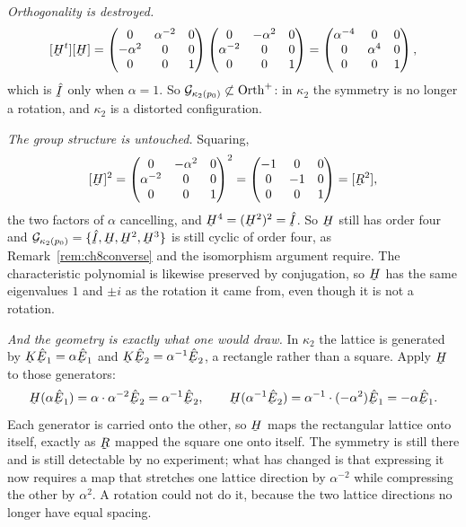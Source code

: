 \emph{Orthogonality is destroyed.}
\[
   [\bH^{t}][\bH]
   =\begin{pmatrix}0&\alpha^{-2}&0\\ -\alpha^{2}&0&0\\
                   0&0&1\end{pmatrix}
    \begin{pmatrix}0&-\alpha^{2}&0\\ \alpha^{-2}&0&0\\
                   0&0&1\end{pmatrix}
   =\begin{pmatrix}\alpha^{-4}&0&0\\ 0&\alpha^{4}&0\\
                   0&0&1\end{pmatrix},
\]
which is $\hI$ only when $\alpha=1$. So
$\mathcal{G}_{\kappa_{2}(p_{0})}\not\subset\operatorname{Orth}^{+}$: in $\kappa_{2}$
the symmetry is no longer a rotation, and $\kappa_{2}$ is a distorted
configuration.

\emph{The group structure is untouched.} Squaring,
\[
   [\bH]^{2}
   =\begin{pmatrix}0&-\alpha^{2}&0\\ \alpha^{-2}&0&0\\
                   0&0&1\end{pmatrix}^{2}
   =\begin{pmatrix}-1&0&0\\ 0&-1&0\\ 0&0&1\end{pmatrix}
   =[\bR^{2}],
\]
the two factors of $\alpha$ cancelling, and $\bH^{4}=(\bH^{2})^{2}=\hI$.
So $\bH$ still has order four and
$\mathcal{G}_{\kappa_{2}(p_{0})}=\{\hI,\bH,\bH^{2},\bH^{3}\}$ is still
cyclic of order four, as Remark~\ref{rem:ch8converse} and the
isomorphism argument require. The characteristic polynomial is likewise
preserved by conjugation, so $\bH$ has the same eigenvalues $1$ and
$\pm i$ as the rotation it came from, even though it is not a rotation.

\emph{And the geometry is exactly what one would draw.} In $\kappa_{2}$
the lattice is generated by $\bK\hbE_{1}=\alpha\hbE_{1}$ and
$\bK\hbE_{2}=\alpha^{-1}\hbE_{2}$, a rectangle rather than a square.
Apply $\bH$ to those generators:
\[
   \bH(\alpha\hbE_{1})=\alpha\cdot\alpha^{-2}\hbE_{2}
   =\alpha^{-1}\hbE_{2},
   \qquad
   \bH(\alpha^{-1}\hbE_{2})=\alpha^{-1}\cdot(-\alpha^{2})\hbE_{1}
   =-\alpha\hbE_{1}.
\]
Each generator is carried onto the other, so $\bH$ maps the rectangular
lattice onto itself, exactly as $\bR$ mapped the square one onto itself.
The symmetry is still there and is still detectable by no experiment;
what has changed is that expressing it now requires a map that stretches
one lattice direction by $\alpha^{-2}$ while compressing the other by
$\alpha^{2}$. A rotation could not do it, because the two lattice
directions no longer have equal spacing.

